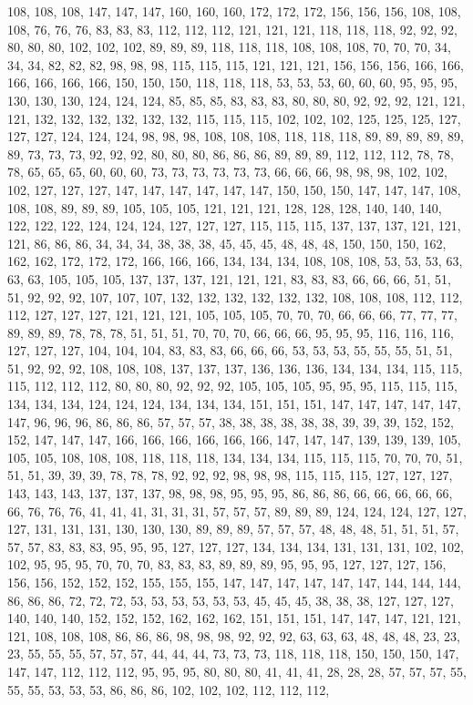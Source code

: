 108, 108, 108, 147, 147, 147, 160, 160, 160, 172, 172, 172, 156, 156, 156, 108, 108, 108, 76, 76, 76, 83, 83, 83, 112, 112, 112, 121, 121, 121, 118, 118, 118, 92, 92, 92, 80, 80, 80, 102, 102, 102, 89, 89, 89, 118, 118, 118, 108, 108, 108, 70, 70, 70, 34, 34, 34, 82, 82, 82, 98, 98, 98, 115, 115, 115, 121, 121, 121, 156, 156, 156, 166, 166, 166, 166, 166, 166, 150, 150, 150, 118, 118, 118, 53, 53, 53, 60, 60, 60, 95, 95, 95, 130, 130, 130, 124, 124, 124, 85, 85, 85, 83, 83, 83, 80, 80, 80, 92, 92, 92, 121, 121, 121, 132, 132, 132, 132, 132, 132, 115, 115, 115, 102, 102, 102, 125, 125, 125, 127, 127, 127, 124, 124, 124, 98, 98, 98, 108, 108, 108, 118, 118, 118, 89, 89, 89, 89, 89, 89, 73, 73, 73, 92, 92, 92, 80, 80, 80, 86, 86, 86, 89, 89, 89, 112, 112, 112, 78, 78, 78, 65, 65, 65, 60, 60, 60, 73, 73, 73, 73, 73, 73, 66, 66, 66, 98, 98, 98, 102, 102, 102, 127, 127, 127, 147, 147, 147, 147, 147, 147, 150, 150, 150, 147, 147, 147, 108, 108, 108, 89, 89, 89, 105, 105, 105, 121, 121, 121, 128, 128, 128, 140, 140, 140, 122, 122, 122, 124, 124, 124, 127, 127, 127, 115, 115, 115, 137, 137, 137, 121, 121, 121, 86, 86, 86, 34, 34, 34, 38, 38, 38, 45, 45, 45, 48, 48, 48, 150, 150, 150, 162, 162, 162, 172, 172, 172, 166, 166, 166, 134, 134, 134, 108, 108, 108, 53, 53, 53, 63, 63, 63, 105, 105, 105, 137, 137, 137, 121, 121, 121, 83, 83, 83, 66, 66, 66, 51, 51, 51, 92, 92, 92, 107, 107, 107, 132, 132, 132, 132, 132, 132, 108, 108, 108, 112, 112, 112, 127, 127, 127, 121, 121, 121, 105, 105, 105, 70, 70, 70, 66, 66, 66, 77, 77, 77, 89, 89, 89, 78, 78, 78, 51, 51, 51, 70, 70, 70, 66, 66, 66, 95, 95, 95, 116, 116, 116, 127, 127, 127, 104, 104, 104, 83, 83, 83, 66, 66, 66, 53, 53, 53, 55, 55, 55, 51, 51, 51, 92, 92, 92, 108, 108, 108, 137, 137, 137, 136, 136, 136, 134, 134, 134, 115, 115, 115, 112, 112, 112, 80, 80, 80, 92, 92, 92, 105, 105, 105, 95, 95, 95, 115, 115, 115, 134, 134, 134, 124, 124, 124, 134, 134, 134, 151, 151, 151, 147, 147, 147, 147, 147, 147, 96, 96, 96, 86, 86, 86, 57, 57, 57, 38, 38, 38, 38, 38, 38, 39, 39, 39, 152, 152, 152, 147, 147, 147, 166, 166, 166, 166, 166, 166, 147, 147, 147, 139, 139, 139, 105, 105, 105, 108, 108, 108, 118, 118, 118, 134, 134, 134, 115, 115, 115, 70, 70, 70, 51, 51, 51, 39, 39, 39, 78, 78, 78, 92, 92, 92, 98, 98, 98, 115, 115, 115, 127, 127, 127, 143, 143, 143, 137, 137, 137, 98, 98, 98, 95, 95, 95, 86, 86, 86, 66, 66, 66, 66, 66, 66, 76, 76, 76, 41, 41, 41, 31, 31, 31, 57, 57, 57, 89, 89, 89, 124, 124, 124, 127, 127, 127, 131, 131, 131, 130, 130, 130, 89, 89, 89, 57, 57, 57, 48, 48, 48, 51, 51, 51, 57, 57, 57, 83, 83, 83, 95, 95, 95, 127, 127, 127, 134, 134, 134, 131, 131, 131, 102, 102, 102, 95, 95, 95, 70, 70, 70, 83, 83, 83, 89, 89, 89, 95, 95, 95, 127, 127, 127, 156, 156, 156, 152, 152, 152, 155, 155, 155, 147, 147, 147, 147, 147, 147, 144, 144, 144, 86, 86, 86, 72, 72, 72, 53, 53, 53, 53, 53, 53, 45, 45, 45, 38, 38, 38, 127, 127, 127, 140, 140, 140, 152, 152, 152, 162, 162, 162, 151, 151, 151, 147, 147, 147, 121, 121, 121, 108, 108, 108, 86, 86, 86, 98, 98, 98, 92, 92, 92, 63, 63, 63, 48, 48, 48, 23, 23, 23, 55, 55, 55, 57, 57, 57, 44, 44, 44, 73, 73, 73, 118, 118, 118, 150, 150, 150, 147, 147, 147, 112, 112, 112, 95, 95, 95, 80, 80, 80, 41, 41, 41, 28, 28, 28, 57, 57, 57, 55, 55, 55, 53, 53, 53, 86, 86, 86, 102, 102, 102, 112, 112, 112, 
